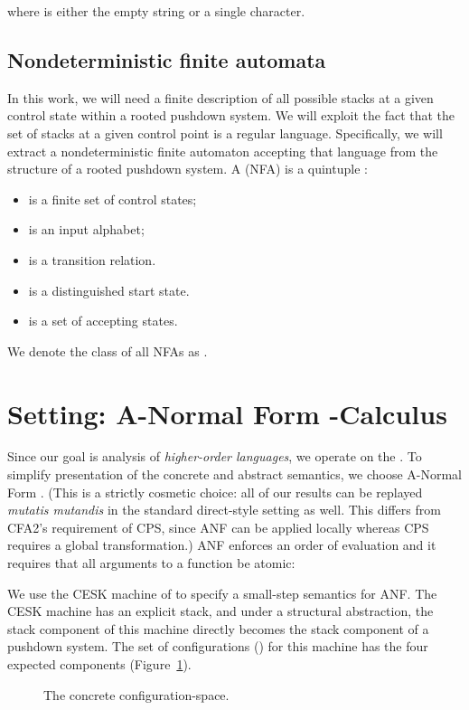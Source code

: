 where  is either the empty string  or a single character.



\subsection{Nondeterministic finite automata}
In this work, we will need a finite description of 
all possible stacks at a given control state within
a rooted pushdown system.
We will exploit the fact that the set of stacks
at a given control point is a regular language.
Specifically, we will extract a nondeterministic finite automaton
accepting that language from the structure
of a rooted pushdown system.
A  (NFA) is a quintuple
:
\begin{itemize}
\item  is a finite set of control states;

\item  is an input alphabet; 

\item  
is a transition relation.

\item  is a distinguished start state.

\item  is a set of accepting states.
\end{itemize}
We denote the class of all NFAs as .


\section{Setting: A-Normal Form 
-Calculus}
\label{sec:anf}

Since our goal is analysis of
\emph{higher-order languages}, we operate on the
\lc{}.
To simplify presentation of the concrete and abstract semantics, we choose 
A-Normal Form \lc{}.
(This is a strictly cosmetic
 choice: all of our results can be replayed \emph{mutatis mutandis} in
 the standard direct-style setting as well.
 This differs from CFA2's requirement of CPS, since ANF can be applied locally whereas CPS requires a global transformation.)
ANF enforces an order of evaluation and it requires
that all arguments to a function be atomic:





We use the CESK machine of \citet{mattmight:Felleisen:1987:CESK} to specify a small-step semantics
for ANF.
The CESK machine has an explicit stack, and under a structural abstraction, the stack
component of this machine directly becomes the stack component of a
pushdown system.
The set of configurations () for 
this machine has the four expected components (Figure~\ref{fig:cesk}).
\begin{figure}
\figrule

\captionsetup{justification=centering}
\caption{The concrete configuration-space.}
\label{fig:cesk}
\figrule
\end{figure}

